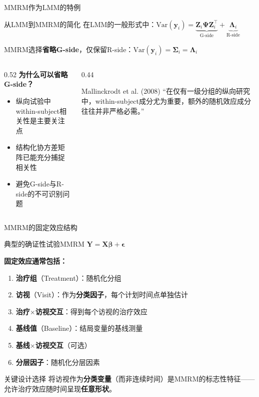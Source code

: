 \documentclass[aspectratio=169,11pt]{beamer}
\newcommand{\bY}{\mathbf{Y}}
\newcommand{\by}{\mathbf{y}}
\newcommand{\bX}{\mathbf{X}}
\newcommand{\bZ}{\mathbf{Z}}
\newcommand{\bbeta}{\boldsymbol{\beta}}
\newcommand{\bepsilon}{\boldsymbol{\epsilon}}
\newcommand{\bSigma}{\boldsymbol{\Sigma}}
\newcommand{\bPsi}{\boldsymbol{\Psi}}
\newcommand{\bLambda}{\boldsymbol{\Lambda}}
\newcommand{\Var}{\mathrm{Var}}
\begin{document}
\begin{frame}{MMRM作为LMM的特例}
\begin{block}{从LMM到MMRM的简化}
在LMM的一般形式中：$\Var(\by_i) = \underbrace{\bZ_i \bPsi \bZ_i^\top}_{\text{G-side}} + \underbrace{\bLambda_i}_{\text{R-side}}$

MMRM选择\textbf{省略G-side}，仅保留R-side：$\Var(\by_i) = \bSigma_i = \bLambda_i$
\end{block}

\vspace{0.2cm}
\begin{columns}[T,totalwidth=\textwidth]
\begin{column}{0.52\textwidth}
\textbf{为什么可以省略G-side？}
\begin{itemize}
    \item 纵向试验中within-subject相关性是主要关注点
    \item 结构化协方差矩阵已能充分捕捉相关性
    \item 避免G-side与R-side的不可识别问题
\end{itemize}
\end{column}
\begin{column}{0.44\textwidth}
\begin{exampleblock}{\footnotesize Mallinckrodt et al. (2008)}
\footnotesize ``在仅有一级分组的纵向研究中，within-subject成分尤为重要，额外的随机效应成分往往并非严格必需。''
\end{exampleblock}
\end{column}
\end{columns}
\end{frame}

\begin{frame}{MMRM的固定效应结构}
\begin{block}{典型的确证性试验MMRM}
$\bY = \bX \bbeta + \bepsilon$
\end{block}

\vspace{0.1cm}
\textbf{固定效应通常包括：}
\begin{enumerate}
    \item \textbf{治疗组}（Treatment）：随机化分组
    \item \textbf{访视}（Visit）：作为\textbf{分类因子}，每个计划时间点单独估计
    \item \textbf{治疗$\times$访视交互}：得到每个访视的治疗效应
    \item \textbf{基线值}（Baseline）：结局变量的基线测量
    \item \textbf{基线$\times$访视交互}（可选）
    \item \textbf{分层因子}：随机化分层因素
\end{enumerate}

\vspace{0.1cm}
\begin{alertblock}{关键设计选择}
将访视作为\textbf{分类变量}（而非连续时间）是MMRM的标志性特征——允许治疗效应随时间呈现\textbf{任意形状}。
\end{alertblock}
\end{frame}
\end{document}

